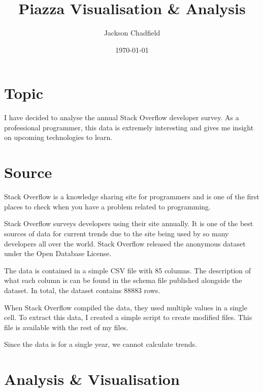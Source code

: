 \documentclass{scrartcl}
\title{Piazza Visualisation \& Analysis}
\author{Jackson Chadfield}
\date{\today}
\begin{document}
\maketitle

\section{Topic}
I have decided to analyse the annual Stack Overflow developer survey\cite{dataset}.
As a professional programmer, this data is extremely interesting and gives me insight on upcoming technologies to learn.

\section{Source}
Stack Overflow is a knowledge sharing site for programmers and is one of the first places to check when you have a problem related to programming.

Stack Overflow surveys developers using their site annually. It is one of the best sources of data for current trends due to the site being used by so many developers all over the world. Stack Overflow released the anonymous dataset under the Open Database License.

The data is contained in a simple CSV file with 85 columns. The description of what each column is can be found in the schema file published alongside the dataset. In total, the dataset contains \num{88883} rows.

When Stack Overflow compiled the data, they used multiple values in a single cell. To extract this data, I created a simple script to create modified files. This file is available with the rest of my files\cite{repo}.

Since the data is for a single year, we cannot calculate trends.

\section{Analysis \& Visualisation}
\end{document}
